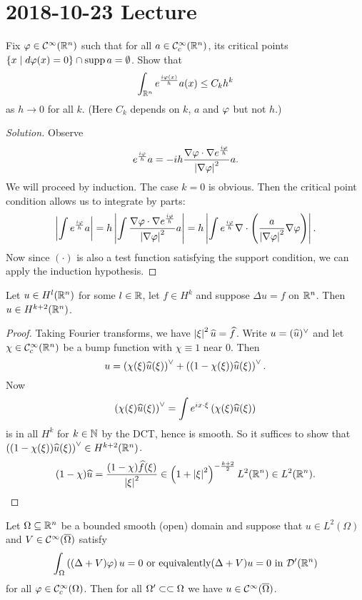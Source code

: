 \section{2018-10-23 Lecture}

\begin{exer}
  Fix $\varphi\in\mathcal{C}^\infty(\mathbb{R}^n)$ such that for all $a\in\mathcal{C}_c^\infty(\mathbb{R}^n)$, its critical points $\{ x \mid d\varphi(x)=0 \} \cap \operatorname{supp} a = \emptyset$.
  Show that
  \[ \int_{\mathbb{R}^n} e^\frac{i\varphi(x)}{h}a(x) \leq C_kh^k \]
  as $h\to0$ for all $k$.
  (Here $C_k$ depends on $k$, $a$ and $\varphi$ but not $h$.)
\end{exer}

\begin{proof}[Solution]
  Observe
  \[ e^\frac{i\varphi}{h}a = -ih\frac{\nabla\varphi\cdot\nabla e^\frac{i\varphi}{h}}{\left\lvert \nabla\varphi \right\rvert^2}a. \]
  We will proceed by induction.
  The case $k=0$ is obvious.
  Then the critical point condition allows us to integrate by parts:
  \[ \left\lvert \int e^\frac{i\varphi}{h}a \right\rvert = h \left\lvert \int\frac{\nabla\varphi\cdot\nabla e^\frac{i\varphi}{h}}{\left\lvert \nabla\varphi \right\rvert^2}a \right\rvert = h \left\lvert \int e^\frac{i\varphi}h\nabla\cdot\left( \frac a{\left\lvert \nabla\varphi \right\rvert^2}\nabla\varphi \right) \right\rvert. \]
  Now since $(\cdot)$ is also a test function satisfying the support condition, we can apply the induction hypothesis.
\end{proof}

\begin{exer}
  Let $u\in H^l(\mathbb{R}^n)$ for some $l\in\mathbb{R}$, let $f\in H^k$ and suppose $\Delta u=f$ on $\mathbb{R}^n$.
  Then $u\in H^{k+2}(\mathbb{R}^n)$.
\end{exer}

\begin{proof}
  Taking Fourier transforms, we have $\left\lvert \xi \right\rvert^2\widehat u=\widehat f$.
  Write $u=(\widehat u)^\vee$ and let $\chi\in\mathcal{C}_c^\infty(\mathbb{R}^n)$ be a bump function with $\chi\equiv1$ near $0$.
  Then
  \[ u = \left( \chi(\xi)\widehat u(\xi) \right)^\vee + \left( (1-\chi(\xi))\widehat u(\xi) \right)^\vee. \]
  Now
  \[ \left( \chi(\xi)\widehat u(\xi) \right)^\vee = \int e^{ix\cdot\xi}\left( \chi(\xi)\widehat u(\xi) \right) \]
  is in all $H^k$ for $k\in\mathbb{N}$ by the DCT, hence is smooth.
  So it suffices to show that $\left( (1-\chi(\xi))\widehat u(\xi) \right)^\vee\in H^{k+2}(\mathbb{R}^n)$.
  \[ (1-\chi)\widehat u = \frac{(1-\chi)\widehat f(\xi)}{\left\lvert \xi \right\rvert^2} \in \left( 1+\left\lvert \xi \right\rvert^2 \right)^{-\frac{k+2}{2}}L^2(\mathbb{R}^n)\in L^2(\mathbb{R}^n).\qedhere \]
\end{proof}

\begin{exer}
  Let $\Omega\subseteq\mathbb{R}^n$ be a bounded smooth (open) domain and suppose that $u\in L^2(\Omega)$ and $V\in\mathcal{C}^\infty(\overline\Omega)$ satisfy
  \[ \int_\Omega \left( (\Delta+V)\varphi \right)u=0 \text{ or equivalently} (\Delta+V)u=0 \text{ in } \mathcal{D}'(\mathbb{R}^n) \]
  for all $\varphi\in\mathcal{C}_c^\infty(\Omega)$.
  Then for all $\Omega'\subset\subset\Omega$ we have $u\in\mathcal{C}^\infty(\overline\Omega)$.
\end{exer}

